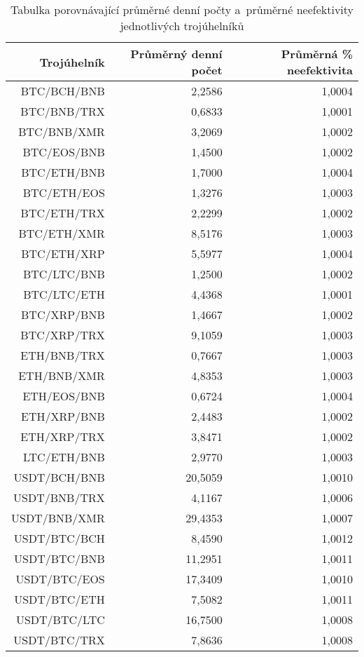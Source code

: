 \begin{table}\centering
\caption{Tabulka porovnávající průměrné denní počty a~průměrné neefektivity jednotlivých trojúhelníků}
\label{table_averages}
\begin{tabular}{|| r | r | r ||}\hline Trojúhelník & Průměrný denní počet & Průměrná \% neefektivita\\ [0.5ex]
 \hline\hline BTC/BCH/BNB & 2,2586 & 1,0004\\ 
 \hline BTC/BNB/TRX & 0,6833 & 1,0001\\ 
 \hline BTC/BNB/XMR & 3,2069 & 1,0002\\ 
 \hline BTC/EOS/BNB & 1,4500 & 1,0002\\ 
 \hline BTC/ETH/BNB & 1,7000 & 1,0004\\ 
 \hline BTC/ETH/EOS & 1,3276 & 1,0003\\ 
 \hline BTC/ETH/TRX & 2,2299 & 1,0002\\ 
 \hline BTC/ETH/XMR & 8,5176 & 1,0003\\ 
 \hline BTC/ETH/XRP & 5,5977 & 1,0004\\ 
 \hline BTC/LTC/BNB & 1,2500 & 1,0002\\ 
 \hline BTC/LTC/ETH & 4,4368 & 1,0001\\ 
 \hline BTC/XRP/BNB & 1,4667 & 1,0002\\ 
 \hline BTC/XRP/TRX & 9,1059 & 1,0003\\ 
 \hline ETH/BNB/TRX & 0,7667 & 1,0003\\ 
 \hline ETH/BNB/XMR & 4,8353 & 1,0003\\ 
 \hline ETH/EOS/BNB & 0,6724 & 1,0004\\ 
 \hline ETH/XRP/BNB & 2,4483 & 1,0002\\ 
 \hline ETH/XRP/TRX & 3,8471 & 1,0002\\ 
 \hline LTC/ETH/BNB & 2,9770 & 1,0003\\ 
 \hline USDT/BCH/BNB & 20,5059 & 1,0010\\ 
 \hline USDT/BNB/TRX & 4,1167 & 1,0006\\ 
 \hline USDT/BNB/XMR & 29,4353 & 1,0007\\ 
 \hline USDT/BTC/BCH & 8,4590 & 1,0012\\ 
 \hline USDT/BTC/BNB & 11,2951 & 1,0011\\ 
 \hline USDT/BTC/EOS & 17,3409 & 1,0010\\ 
 \hline USDT/BTC/ETH & 7,5082 & 1,0011\\ 
 \hline USDT/BTC/LTC & 16,7500 & 1,0008\\ 
 \hline USDT/BTC/TRX & 7,8636 & 1,0008\\ 

\end{tabular}
\end{table}
